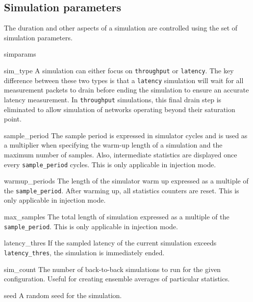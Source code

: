 \documentclass[11pt]{article}
\begin{document}
\subsection{Simulation parameters}
\label{sec:sim_params}

The duration and other aspects of a simulation are controlled using
the set of simulation parameters.

\begin{opt_list}{simparams}

\item[sim\_type] A simulation can either focus on
\texttt{throughput} or \texttt{latency}.  The key difference between
these two types is that a \texttt{latency} simulation will wait for
all measurement packets to drain before ending the simulation to
ensure an accurate latency measurement.  In \texttt{throughput}
simulations, this final drain step is eliminated to allow simulation
of networks operating beyond their saturation point.

\item[sample\_period] The sample period is expressed in simulator
cycles and is used as a multiplier when specifying the warm-up length
of a simulation and the maximum number of samples.  Also, intermediate
statistics are displayed once every \texttt{sample\_period} cycles. This is only applicable in injection mode.

\item[warmup\_periods] The length of the simulator warm up expressed
as a multiple of the \texttt{sample\_period}.  After warming up, all
statistics counters are reset. This is only applicable in injection mode.

\item[max\_samples] The total length of simulation expressed as a
multiple of the \texttt{sample\_period}. This is only applicable in injection mode.

\item[latency\_thres] If the sampled latency of the current simulation
exceeds \texttt{latency\_thres}, the simulation is immediately ended.

\item[sim\_count] The number of back-to-back simulations to run for the
given configuration.  Useful for creating ensemble averages of
particular statistics.

\item[seed] A random seed for the simulation.



\end{opt_list}
\end{document}
